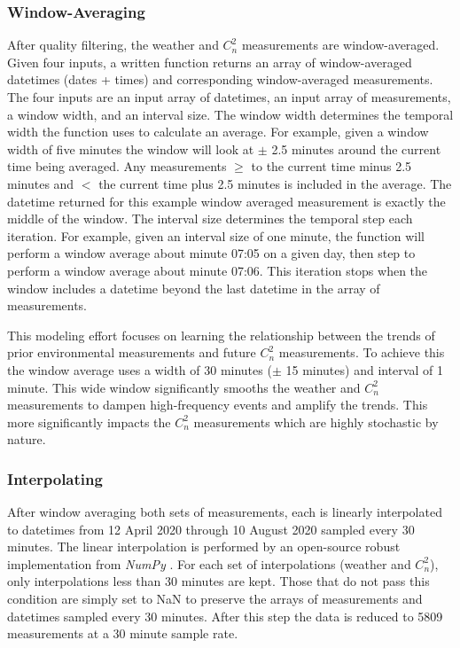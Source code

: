 \subsubsection{Window-Averaging}
After quality filtering, the weather and $C_{n}^{2}$ measurements are window-averaged. Given four inputs, a written function returns an array of window-averaged datetimes (dates + times) and corresponding window-averaged measurements. The four inputs are an input array of datetimes, an input array of measurements, a window width, and an interval size. The window width determines the temporal width the function uses to calculate an average. For example, given a window width of five minutes the window will look at $\pm$ 2.5 minutes around the current time being averaged. Any measurements $\ge$ to the current time minus 2.5 minutes and $<$ the current time plus 2.5 minutes is included in the average. The datetime returned for this example window averaged measurement is exactly the middle of the window. The interval size determines the temporal step each iteration. For example, given an interval size of one minute, the function will perform a window average about minute 07:05 on a given day, then step to perform a window average about minute 07:06. This iteration stops when the window includes a datetime beyond the last datetime in the array of measurements.

This modeling effort focuses on learning the relationship between the trends of prior environmental measurements and future $C_{n}^{2}$ measurements. To achieve this the window average uses a width of 30 minutes ($\pm$ 15 minutes) and interval of 1 minute. This wide window significantly smooths the weather and $C_{n}^{2}$ measurements to dampen high-frequency events and amplify the trends. This more significantly impacts the $C_{n}^{2}$ measurements which are highly stochastic by nature. 

\subsubsection{Interpolating}
After window averaging both sets of measurements, each is linearly interpolated to datetimes from 12 April 2020 through 10 August 2020 sampled every 30 minutes. The linear interpolation is performed by an open-source robust implementation from \textit{NumPy} \cite{harris2020array}. For each set of interpolations (weather and $C_{n}^{2}$), only interpolations less than 30 minutes are kept. Those that do not pass this condition are simply set to \ac{NaN} to preserve the arrays of measurements and datetimes sampled every 30 minutes. After this step the data is reduced to 5809 measurements at a 30 minute sample rate.

